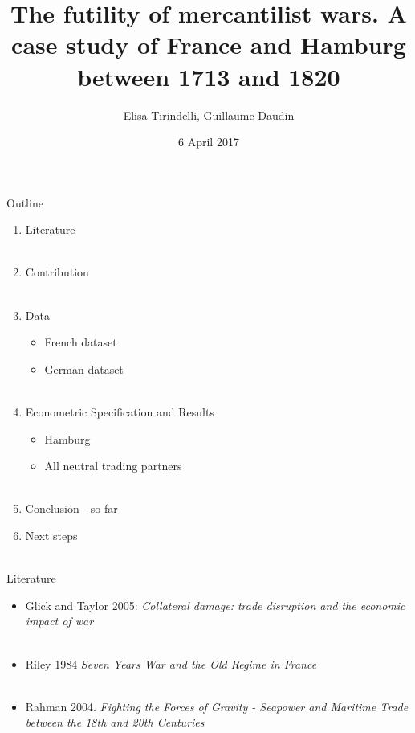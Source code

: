 \documentclass[11pt]{beamer}
\author{Elisa Tirindelli, Guillaume Daudin}
\title{The futility of mercantilist wars. A case study of France and Hamburg between 1713 and 1820}
\date{6 April 2017}
\begin{document}
\begin{frame}
\titlepage
\end{frame}

\begin{frame}{Outline}
\begin{enumerate}
\item{Literature}\\~\\
\item{Contribution}\\~\\
\item{Data}
\begin{itemize}
\item{French dataset}
\item{German dataset}\\~\\
\end{itemize}
\item{Econometric Specification and Results}
\begin{itemize}
\item{Hamburg}
\item{All neutral trading partners}\\~\\
\end{itemize}
\item{Conclusion - so far}
\item{Next steps}\\~\\
\end{enumerate}
\end{frame}


\begin{frame}{Literature}
\begin{itemize}
\item{Glick and Taylor 2005: \textit{Collateral damage: trade disruption and the economic impact of war}}\\~\\
\item{Riley 1984 \textit{Seven Years War and the Old Regime in France}}\\~\\
\item{Rahman 2004. \textit{Fighting the Forces of Gravity - Seapower and Maritime Trade between the 18th and 20th Centuries}}
\end{itemize}
\end{frame}
\end{document}
